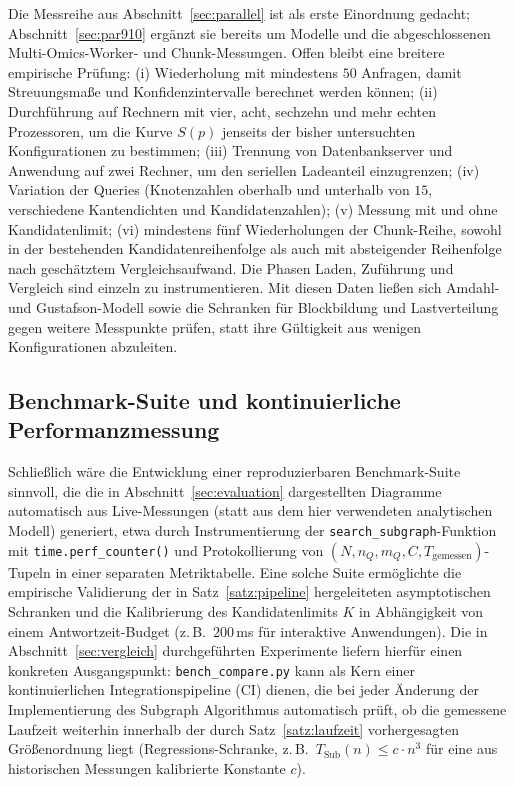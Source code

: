 \documentclass[a4paper,12pt, twoside]{report}
\theoremstyle{definition}
\begin{document}
Die Messreihe aus Abschnitt~\ref{sec:parallel} ist als erste Einordnung gedacht; Abschnitt~\ref{sec:par910} ergänzt sie bereits um Modelle und die abgeschlossenen Multi-Omics-Worker- und Chunk-Messungen. Offen bleibt eine breitere empirische Prüfung: (i) Wiederholung mit mindestens $50$ Anfragen, damit Streuungsmaße und Konfidenzintervalle berechnet werden können; (ii) Durchführung auf Rechnern mit vier, acht, sechzehn und mehr echten Prozessoren, um die Kurve $S(p)$ jenseits der bisher untersuchten Konfigurationen zu bestimmen; (iii) Trennung von Datenbankserver und Anwendung auf zwei Rechner, um den seriellen Ladeanteil einzugrenzen; (iv) Variation der Queries (Knotenzahlen oberhalb und unterhalb von $15$, verschiedene Kantendichten und Kandidatenzahlen); (v) Messung mit und ohne Kandidatenlimit; (vi) mindestens fünf Wiederholungen der Chunk-Reihe, sowohl in der bestehenden Kandidatenreihenfolge als auch mit absteigender Reihenfolge nach geschätztem Vergleichsaufwand. Die Phasen Laden, Zuführung und Vergleich sind einzeln zu instrumentieren. Mit diesen Daten ließen sich Amdahl- und Gustafson-Modell sowie die Schranken für Blockbildung und Lastverteilung gegen weitere Messpunkte prüfen, statt ihre Gültigkeit aus wenigen Konfigurationen abzuleiten.

\subsection{Benchmark-Suite und kontinuierliche Performanzmessung}

Schließlich wäre die Entwicklung einer reproduzierbaren Benchmark-Suite sinnvoll, die die in Abschnitt~\ref{sec:evaluation} dargestellten Diagramme automatisch aus Live-Messungen (statt aus dem hier verwendeten analytischen Modell) generiert, etwa durch Instrumentierung der \texttt{search\_subgraph}-Funktion mit \texttt{time.perf\_counter()} und Protokollierung von $(N,n_Q,m_Q,C,T_{\text{gemessen}})$-Tupeln in einer separaten Metriktabelle. Eine solche Suite ermöglichte die empirische Validierung der in Satz~\ref{satz:pipeline} hergeleiteten asymptotischen Schranken und die Kalibrierung des Kandidatenlimits $K$ in Abhängigkeit von einem Antwortzeit-Budget (z.\,B.\ $200\,$ms für interaktive Anwendungen). Die in Abschnitt~\ref{sec:vergleich} durchgeführten Experimente liefern hierfür einen konkreten Ausgangspunkt: \texttt{bench\_compare.py} kann als Kern einer kontinuierlichen Integrationspipeline (CI) dienen, die bei jeder Änderung der Implementierung des Subgraph Algorithmus automatisch prüft, ob die gemessene Laufzeit weiterhin innerhalb der durch Satz~\ref{satz:laufzeit} vorhergesagten Größenordnung liegt (Regressions-Schranke, z.\,B.\ $T_{\text{Sub}}(n) \le c\cdot n^3$ für eine aus historischen Messungen kalibrierte Konstante $c$).
\end{document}
